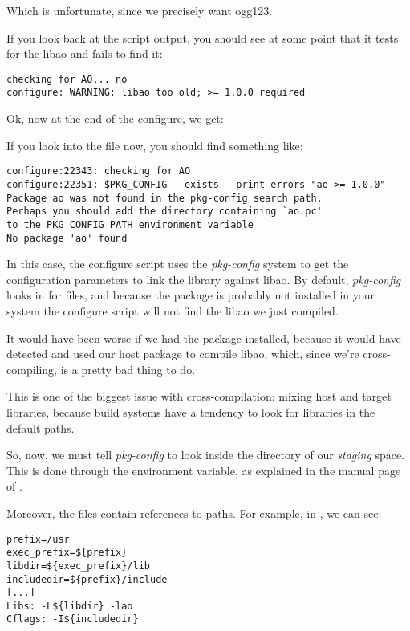 Which is unfortunate, since we precisely want ogg123.

If you look back at the script output, you should see at some point
that it tests for the libao and fails to find it:

\begin{verbatim}
checking for AO... no
configure: WARNING: libao too old; >= 1.0.0 required
\end{verbatim}

Ok, now at the end of the configure, we get:

If you look into the  file now, you should find
something like:

\begin{verbatim}
configure:22343: checking for AO
configure:22351: $PKG_CONFIG --exists --print-errors "ao >= 1.0.0"
Package ao was not found in the pkg-config search path.
Perhaps you should add the directory containing `ao.pc'
to the PKG_CONFIG_PATH environment variable
No package 'ao' found
\end{verbatim}

In this case, the configure script uses the {\em pkg-config} system to
get the configuration parameters to link the library against libao. By
default, {\em pkg-config} looks in  for
 files, and because the  package is probably
not installed in your system the configure script will not find the
libao we just compiled.

It would have been worse if we had the package installed, because it
would have detected and used our host package to compile libao, which,
since we're cross-compiling, is a pretty bad thing to do.

This is one of the biggest issue with cross-compilation: mixing host
and target libraries, because build systems have a tendency to look
for libraries in the default paths.

So, now, we must tell {\em pkg-config} to look inside the
 directory of our {\em staging} space. This
is done through the  environment variable, as
explained in the manual page of .

Moreover, the  files contain references to paths. For
example, in
,
we can see:

\begin{verbatim}
prefix=/usr
exec_prefix=${prefix}
libdir=${exec_prefix}/lib
includedir=${prefix}/include
[...]
Libs: -L${libdir} -lao
Cflags: -I${includedir}
\end{verbatim}

